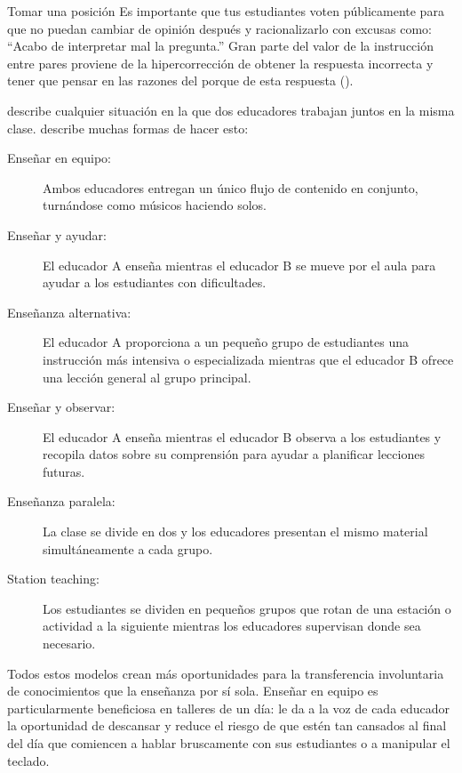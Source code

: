 \newpage
\begin{aside}{Tomar una posición}
  Es importante que tus estudiantes voten públicamente
  para que no puedan cambiar de opinión después y racionalizarlo
  con excusas como: ``Acabo de interpretar mal la pregunta.''
  Gran parte del valor de la instrucción entre pares proviene de la hipercorrección
  de obtener la respuesta incorrecta
  y tener que pensar en las razones del porque de esta respuesta
  ().
\end{aside}


 describe cualquier situación
en la que dos educadores trabajan juntos en la misma clase.
\cite{Frie2016} describe muchas formas de hacer esto:

\begin{description}

\item[Enseñar en equipo:]
  Ambos educadores entregan un único flujo de contenido en conjunto,
  turnándose como músicos haciendo solos.

\item[Enseñar y ayudar:]
  El educador A enseña mientras el educador B se mueve por el aula
  para ayudar a los estudiantes con dificultades.

\item[Enseñanza alternativa:]
  El educador A proporciona a un pequeño grupo de estudiantes
  una instrucción más intensiva o especializada
  mientras que el educador B ofrece una lección general al grupo principal.
 
\item[Enseñar y observar:]
  El educador A enseña mientras el educador B observa a los estudiantes
  y recopila datos sobre su comprensión para ayudar a planificar lecciones futuras.

\item[Enseñanza paralela:]
  La clase se divide en dos
  y los educadores presentan el mismo material simultáneamente a cada grupo.

\item[Station teaching:]
  Los estudiantes se dividen en pequeños grupos
  que rotan de una estación o actividad a la siguiente
  mientras los educadores supervisan donde sea necesario.

\end{description}

Todos estos modelos crean más oportunidades para la transferencia involuntaria de conocimientos que la enseñanza por sí sola.
Enseñar en equipo es particularmente beneficiosa en talleres de un día:
le da a la voz de cada educador la oportunidad de descansar
y reduce el riesgo de que estén tan cansados al final del día
que comiencen a hablar bruscamente con sus estudiantes
o a manipular el teclado.

